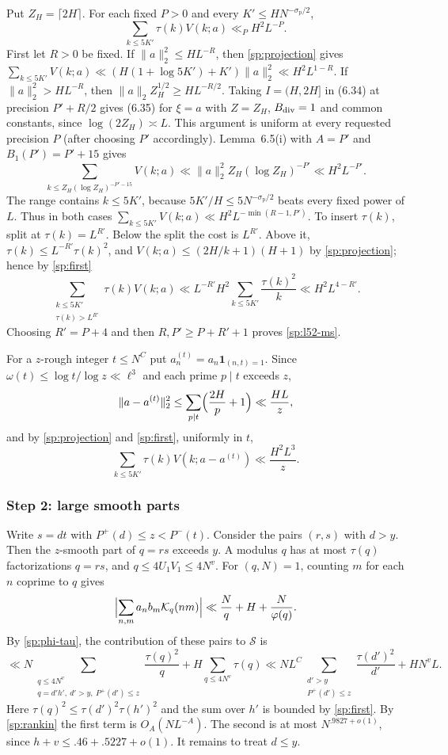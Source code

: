 Put $Z_H=\lceil2H\rceil$. For each fixed $P>0$ and every $K'\le HN^{-\sigma_{\mathrm p}/2}$,
\begin{equation}\label{sp:l52-ms}
 \sum_{k\le5K'}\tau(k)V(k;a)\ll_PH^2L^{-P}.
\end{equation}
First let $R>0$ be fixed. If $\|a\|_2^2\le HL^{-R}$, then
\eqref{sp:projection} gives
$\sum_{k\le5K'}V(k;a)\ll(H(1+\log5K')+K')\|a\|_2^2\ll H^2L^{1-R}$. If
$\|a\|_2^2>HL^{-R}$, then $\|a\|_2Z_H^{1/2}\ge HL^{-R/2}$. Taking
$I=(H,2H]$ in (6.34) at precision $P'+R/2$ gives (6.35) for $\xi=a$ with
$Z=Z_H$, $B_{\rm div}=1$ and common constants, since $\log(2Z_H)\asymp L$.
This argument is uniform at every requested precision $P$ (after choosing
$P'$ accordingly).
Lemma~6.5(i) with $A=P'$ and $B_1(P')=P'+15$ gives
\[
 \sum_{k\le Z_H(\log Z_H)^{-P'-15}}V(k;a)\ll\|a\|_2^2Z_H(\log Z_H)^{-P'}
 \ll H^2L^{-P'}.
\]
The range contains $k\le5K'$, because $5K'/H\le5N^{-\sigma_{\mathrm p}/2}$
beats every fixed power of $L$. Thus in both cases
$\sum_{k\le5K'}V(k;a)\ll H^2L^{-\min(R-1,P')}$. To insert $\tau(k)$, split at
$\tau(k)=L^{R'}$. Below the split the cost is $L^{R'}$. Above it,
$\tau(k)\le L^{-R'}\tau(k)^2$, and $V(k;a)\le(2H/k+1)(H+1)$ by
\eqref{sp:projection}; hence by \eqref{sp:first}
\[
 \sum_{\substack{k\le5K'\\\tau(k)>L^{R'}}}\tau(k)V(k;a)
 \ll L^{-R'}H^2\sum_{k\le5K'}\frac{\tau(k)^2}k\ll H^2L^{4-R'} .
\]
Choosing $R'=P+4$ and then $R,P'\ge P+R'+1$ proves \eqref{sp:l52-ms}.

For a $z$-rough integer $t\le N^{C}$ put $a^{(t)}_n=a_n\mathbf1_{(n,t)=1}$.
Since $\omega(t)\le\log t/\log z\ll\ell^3$ and each prime $p\mid t$ exceeds
$z$,
\[
 \|a-a^{(t)}\|_2^2\le\sum_{p\mid t}\Bigl(\frac{2H}p+1\Bigr)\ll\frac{HL}z ,
\]
and by \eqref{sp:projection} and \eqref{sp:first}, uniformly in $t$,
\begin{equation}\label{sp:l52-mask}
 \sum_{k\le5K'}\tau(k)V(k;a-a^{(t)})\ll\frac{H^2L^3}z .
\end{equation}

\subsubsection*{Step 2: large smooth parts}
Write $s=dt$ with $P^+(d)\le z<P^-(t)$. Consider the pairs $(r,s)$ with
$d>y$. Then the $z$-smooth part of $q=rs$ exceeds $y$. A modulus $q$ has at
most $\tau(q)$ factorizations $q=rs$, and $q\le4U_1V_1\le4N^v$. For
$(q,N)=1$, counting $m$ for each $n$ coprime to $q$ gives
\[
 \Bigl|\sum_{n,m}a_nb_m\mathcal K_q(nm)\Bigr|\ll\frac Nq+H+\frac N{\varphi(q)} .
\]
By \eqref{sp:phi-tau}, the contribution of these pairs to $\mathcal S$ is
\[
 \ll N\sum_{\substack{q\le4N^v\\ q=d'h',\ d'>y,\ P^+(d')\le z}}\frac{\tau(q)^2}q
 +H\sum_{q\le4N^v}\tau(q)
 \ll NL^{C}\sum_{\substack{d'>y\\P^+(d')\le z}}\frac{\tau(d')^2}{d'}
 +HN^vL .
\]
Here $\tau(q)^2\le\tau(d')^2\tau(h')^2$ and the sum over $h'$ is bounded
by \eqref{sp:first}. By \eqref{sp:rankin} the first term is
$O_A(NL^{-A})$. The second is at most $N^{.9827+o(1)}$, since
$h+v\le.46+.5227+o(1)$. It remains to treat $d\le y$.


